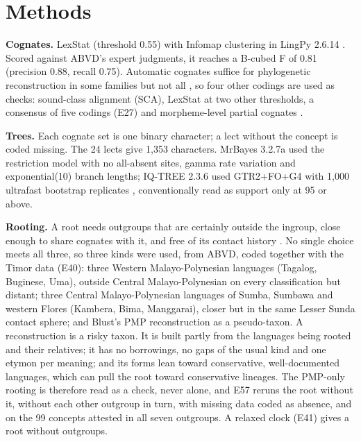 \documentclass[11pt]{article}
\begin{document}
\section{Methods}

\textbf{Cognates.} LexStat (threshold 0.55) with Infomap clustering in LingPy 2.6.14 \citep{list2017}. Scored against ABVD's expert judgments, it reaches a B-cubed F of 0.81 (precision 0.88, recall 0.75). Automatic cognates suffice for phylogenetic reconstruction in some families but not all \citep{rama2018}, so four other codings are used as checks: sound-class alignment (SCA), LexStat at two other thresholds, a consensus of five codings (E27) and morpheme-level partial cognates \citep[E51;][]{list2016}.

\textbf{Trees.} Each cognate set is one binary character; a lect without the concept is coded missing. The 24 lects give 1,353 characters. MrBayes 3.2.7a \citep{ronquist2012} used the restriction model with no all-absent sites, gamma rate variation and exponential(10) branch lengths; IQ-TREE 2.3.6 \citep{minh2020} used GTR2+FO+G4 with 1,000 ultrafast bootstrap replicates \citep[UFBoot;][]{hoang2018}, conventionally read as support only at 95 or above.

\textbf{Rooting.} A root needs outgroups that are certainly outside the ingroup, close enough to share cognates with it, and free of its contact history \citep{nixon1993}. No single choice meets all three, so three kinds were used, from ABVD, coded together with the Timor data (E40): three Western Malayo-Polynesian languages (Tagalog, Buginese, Uma), outside Central Malayo-Polynesian on every classification but distant; three Central Malayo-Polynesian languages of Sumba, Sumbawa and western Flores (Kambera, Bima, Manggarai), closer but in the same Lesser Sunda contact sphere; and Blust's PMP reconstruction \citep{blust2013} as a pseudo-taxon. A reconstruction is a risky taxon. It is built partly from the languages being rooted and their relatives; it has no borrowings, no gaps of the usual kind and one etymon per meaning; and its forms lean toward conservative, well-documented languages, which can pull the root toward conservative lineages. The PMP-only rooting is therefore read as a check, never alone, and E57 reruns the root without it, without each other outgroup in turn, with missing data coded as absence, and on the 99 concepts attested in all seven outgroups. A relaxed clock (E41) gives a root without outgroups.
\end{document}
